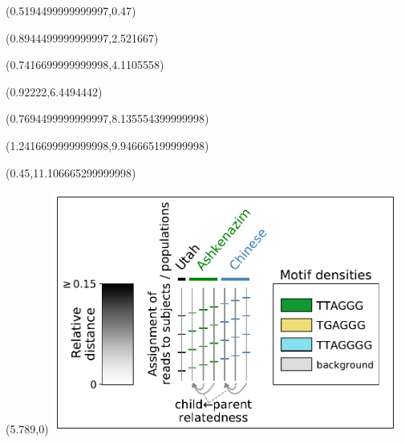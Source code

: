 \documentclass{article}
\begin{document}
\begin{textblock}{13}(0.5194499999999997,0.47)\end{textblock}
\begin{textblock}{13}(0.8944499999999997,2.521667)\end{textblock}
\begin{textblock}{13}(0.7416699999999998,4.1105558)\end{textblock}
\begin{textblock}{13}(0.92222,6.4494442)\end{textblock}
\begin{textblock}{13}(0.7694499999999997,8.135554399999998)\end{textblock}
\begin{textblock}{13}(1.2416699999999998,9.946665199999998)\end{textblock}
\begin{textblock}{13}(0.45,11.106665299999998)\end{textblock}
\begin{textblock}{13}(5.789,0)
\includegraphics[width=4.500in,keepaspectratio]{Figure_5/legend.pdf}
\end{textblock}
\end{document}
